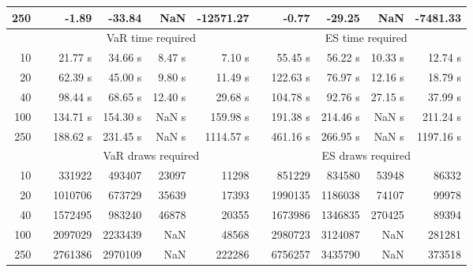 {{\begin{longtable}{rr rrrr r rrrr}
250 && -1.89 & -33.84 &  NaN & -12571.27 && -0.77 & -29.25 &  NaN & -7481.33 \\ 
\hline 
 & & \multicolumn{4}{c}{VaR time required} && \multicolumn{4}{c}{ES time required} \\ \cline{3-6}  \cline{8-11}
10 & & 21.77 s & 34.66 s & 8.47 s & 7.10 s && 55.45 s & 56.22 s & 10.33 s & 12.74 s \\ 
20 & & 62.39 s & 45.00 s & 9.80 s & 11.49 s && 122.63 s & 76.97 s & 12.16 s & 18.79 s \\ 
40 & & 98.44 s & 68.65 s & 12.40 s & 29.68 s && 104.78 s & 92.76 s & 27.15 s & 37.99 s \\ 
100 & & 134.71 s & 154.30 s &  NaN s & 159.98 s && 191.38 s & 214.46 s &  NaN s & 211.24 s \\ 
250 & & 188.62 s & 231.45 s &  NaN s & 1114.57 s && 461.16 s & 266.95 s &  NaN s & 1197.16 s \\ 
\hline 
 && \multicolumn{4}{c}{VaR draws required} &&   \multicolumn{4}{c}{ES draws required} \\  \cline{3-6}  \cline{8-11} 
10 & & 331922 & 493407 & 23097 & 11298 && 851229 & 834580 & 53948  & 86332 \\ 
20 & & 1010706 & 673729 & 35639 & 17393 && 1990135 & 1186038 & 74107  & 99978 \\ 
40 & & 1572495 & 983240 & 46878 & 20355 && 1673986 & 1346835 & 270425  & 89394 \\ 
100 & & 2097029 & 2233439 & NaN & 48568 && 2980723 & 3124087 & NaN  & 281281 \\ 
250 & & 2761386 & 2970109 & NaN & 222286 && 6756257 & 3435790 & NaN  & 373518 \\ 
\hline 
\end{longtable} 
} 
} 
